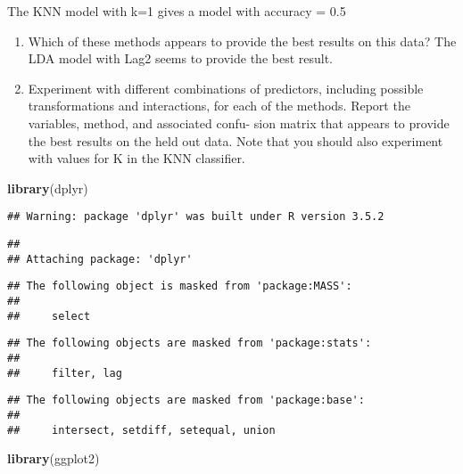 \documentclass[]{article}
\newenvironment{Shaded}{\begin{snugshade}}{\end{snugshade}}
\newcommand{\KeywordTok}[1]{\textcolor[rgb]{0.13,0.29,0.53}{\textbf{{#1}}}}
\newcommand{\NormalTok}[1]{{#1}}
\begin{document}
The KNN model with k=1 gives a model with accuracy = 0.5

\begin{enumerate}
\def\labelenumi{(\alph{enumi})}
\setcounter{enumi}{7}
\item
  Which of these methods appears to provide the best results on this
  data? The LDA model with Lag2 seems to provide the best result.
\item
  Experiment with different combinations of predictors, including
  possible transformations and interactions, for each of the methods.
  Report the variables, method, and associated confu- sion matrix that
  appears to provide the best results on the held out data. Note that
  you should also experiment with values for K in the KNN classifier.
\end{enumerate}

\begin{Shaded}
\begin{Highlighting}[]
\KeywordTok{library}\NormalTok{(dplyr)}
\end{Highlighting}
\end{Shaded}

\begin{verbatim}
## Warning: package 'dplyr' was built under R version 3.5.2
\end{verbatim}

\begin{verbatim}
## 
## Attaching package: 'dplyr'
\end{verbatim}

\begin{verbatim}
## The following object is masked from 'package:MASS':
## 
##     select
\end{verbatim}

\begin{verbatim}
## The following objects are masked from 'package:stats':
## 
##     filter, lag
\end{verbatim}

\begin{verbatim}
## The following objects are masked from 'package:base':
## 
##     intersect, setdiff, setequal, union
\end{verbatim}

\begin{Shaded}
\begin{Highlighting}[]
\KeywordTok{library}\NormalTok{(ggplot2)}
\end{Highlighting}
\end{Shaded}
\end{document}
